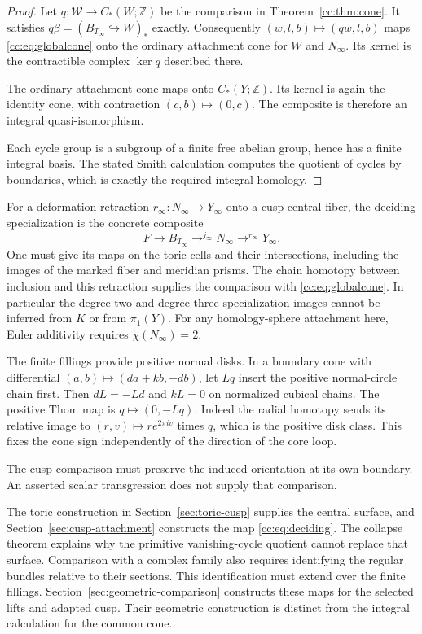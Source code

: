\begin{proof}
Let $q:\mathcal W\to C_*(W;\mathbb Z)$ be the comparison in
Theorem~\ref{cc:thm:cone}.
It satisfies $q\beta=(B_{T_\infty}\hookrightarrow W)_*$ exactly.
Consequently $(w,l,b)\mapsto(qw,l,b)$ maps \eqref{cc:eq:globalcone}
onto the ordinary attachment cone for $W$ and $N_\infty$.
Its kernel is the contractible complex $\ker q$ described there.

The ordinary attachment cone maps onto $C_*(Y;\mathbb Z)$.
Its kernel is again the identity cone, with contraction
$(c,b)\mapsto(0,c)$.
The composite is therefore an integral quasi-isomorphism.

Each cycle group is a subgroup of a finite free abelian group, hence
has a finite integral basis.
The stated Smith calculation computes the quotient of cycles by boundaries,
which is exactly the required integral homology.
\end{proof}

For a deformation retraction $r_\infty:N_\infty\to Y_\infty$ onto a cusp
central fiber, the deciding specialization is the concrete composite
\begin{equation}\label{cc:eq:deciding}
F\longrightarrow B_{T_\infty}
 \mathrel{\mathop{\longrightarrow}^{j_\infty}}N_\infty
 \mathrel{\mathop{\longrightarrow}^{r_\infty}}Y_\infty.
\end{equation}
One must give its maps on the toric cells and their intersections,
including the images of the marked fiber and meridian prisms.
The chain homotopy between inclusion and this retraction supplies the
comparison with \eqref{cc:eq:globalcone}.
In particular the degree-two and degree-three specialization images
cannot be inferred from $K$ or from $\pi_1(Y)$.
For any homology-sphere attachment here, Euler additivity requires
$\chi(N_\infty)=2$.

The finite fillings provide positive normal disks.
In a boundary cone with differential $(a,b)\mapsto(da+kb,-db)$, let
$Lq$ insert the positive normal-circle chain first.
Then $dL=-Ld$ and $kL=0$ on normalized cubical chains.
The positive Thom map is $q\mapsto(0,-Lq)$.
Indeed the radial homotopy sends its relative image to
$(r,v)\mapsto re^{2\pi iv}$ times $q$, which is the positive disk class.
This fixes the cone sign independently of the direction of the core loop.

The cusp comparison must preserve the induced orientation at its own
boundary. An asserted scalar transgression does not supply that comparison.

The toric construction in Section~\ref{sec:toric-cusp} supplies the
central surface, and Section~\ref{sec:cusp-attachment} constructs
the map \eqref{cc:eq:deciding}. The collapse theorem explains why
the primitive vanishing-cycle quotient cannot replace that surface.
Comparison with a complex family also requires identifying the regular
bundles relative to their sections.
This identification must extend over the finite fillings. Section~\ref{sec:geometric-comparison}
constructs these maps for the selected lifts and adapted cusp. Their
geometric construction is distinct from the integral calculation for
the common cone.
